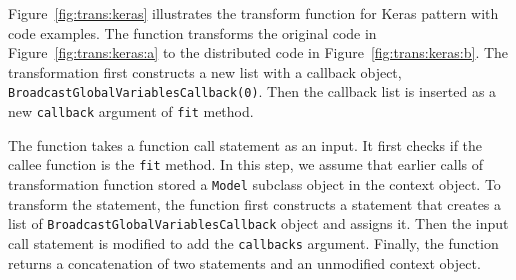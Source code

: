 \begin{inred}
Figure~\ref{fig:trans:keras} illustrates the transform function for Keras
pattern with code examples.
The function transforms the original code in Figure~\ref{fig:trans:keras:a}
to the distributed code in Figure~\ref{fig:trans:keras:b}.
The transformation first constructs a new list with a
callback object, {\tt BroadcastGlobalVariablesCallback(0)}.
Then the callback list is inserted as a new {\tt callback} argument
of {\tt fit} method.

The function takes a function call statement as an input.
It first checks if the callee function is the {\tt fit} method.
In this step, we assume that earlier calls of transformation function
stored a {\tt Model} subclass object in the context object.
To transform the statement,
the function first constructs a statement that creates a list of
{\tt BroadcastGlobalVariablesCallback} object and assigns it.
Then the input call statement is modified to
add the {\tt callbacks} argument.
Finally, the function returns a concatenation of two statements
and an unmodified context object.

\end{inred}

